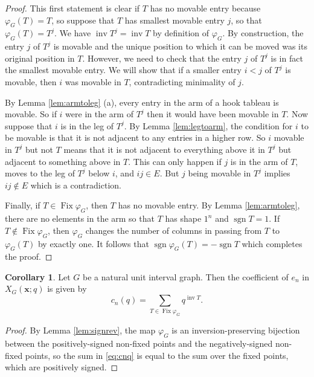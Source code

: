 \documentclass[10pt,a4paper]{amsart}
\theoremstyle{definition}
\newtheorem{corollary}[theorem]{Corollary}
\theoremstyle{remark}
\numberwithin{equation}{section}
\DeclareMathOperator{\inv}{inv}
\DeclareMathOperator{\Fix}{Fix}
\DeclareMathOperator{\sgn}{sgn}
\begin{document}
\begin{proof}
This first statement is clear if $T$ has no movable entry because $\varphi_G(T)=T$, so suppose that $T$ has smallest movable entry $j$, so that $\varphi_G(T)=T^j$. We have $\inv T^j=\inv T$ by definition of $\varphi_G$.
By construction, the entry $j$ of $T^j$ is movable and the unique position to which it can be moved was its original position in $T$. However, we need to check that the entry $j$ of $T^j$ is in fact the smallest movable entry. We will show that if a smaller entry $i<j$ of $T^j$ is movable, then $i$ was movable in $T$, contradicting minimality of $j$. 

By Lemma \ref{lem:armtoleg} (a), every entry in the arm of a hook tableau is movable. So if $i$ were in the arm of $T^j$ then it would have been movable in $T$.   Now  suppose that $i$ is in the leg of $T^j$. By Lemma \ref{lem:legtoarm}, the condition for $i$ to be movable is that it is not adjacent to any entries in a higher row. 
So  $i$  movable in $T^j$ but not $T$ means that it is not adjacent to everything above it in $T^j$ but adjacent to something above in  $T$.  This can only happen if $j$ is in the arm of $T$, moves to the leg of $T^j$ below $i$, and $ij\in E$.  But $j$ being movable in $T^j$ implies $ij\notin E$ which is a contradiction.


Finally, if $T\in\Fix\varphi_G$, then $T$ has no movable entry.
By Lemma \ref{lem:armtoleg}, there are no elements in the arm so that $T$ has shape $1^n$ and $\sgn T =1$. If $T\notin\Fix\varphi_G$, then $\varphi_G$ changes the number of columns in passing from $T$ to $\varphi_G(T)$ by exactly one.  It follows that $\sgn \varphi_G(T) = -\sgn T$ which completes the proof.
\end{proof}

\begin{corollary}
Let $G$ be a natural unit interval graph. Then the coefficient of $e_n$ in $X_G(\bm x;q)$ is given by
\begin{equation}
c_n(q)=\sum_{T\in\Fix\varphi_G}q^{\inv T}.
\end{equation}
\begin{proof}
By Lemma \ref{lem:signrev}, the map $\varphi_G$ is an inversion-preserving bijection between the positively-signed non-fixed points and the negatively-signed non-fixed points, so the sum in \eqref{eq:cnq} is equal to the sum over the fixed points, which are positively signed.
\end{proof}
\end{corollary}
\end{document}
